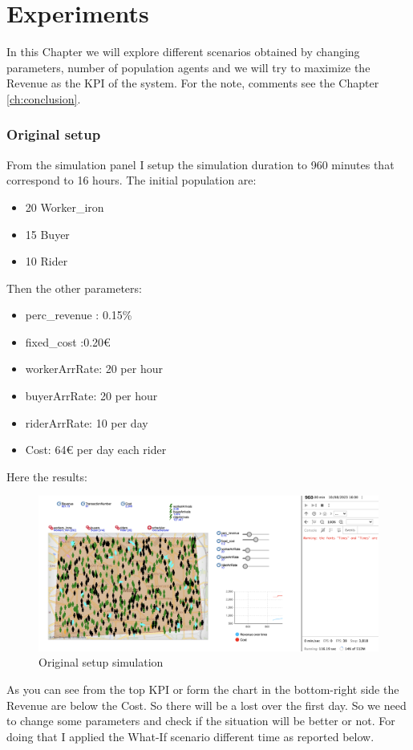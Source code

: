\chapter{Experiments} \label{ch:experiments}
In this Chapter we will explore different scenarios obtained by changing parameters, number of population agents and we will try to maximize the Revenue as the KPI of the system. For the note, comments see the Chapter \ref{ch:conclusion}.
\subsection{Original setup}
From the simulation panel I setup the simulation duration to 960 minutes that correspond to 16 hours. The initial population are:
\begin{itemize}
\item 20 Worker\_iron
\item 15 Buyer
\item 10 Rider
\end{itemize}
Then the other parameters:
\begin{itemize}
\item perc\_revenue : 0.15\%
\item fixed\_cost :0.20€
\item workerArrRate: 20 per hour
\item buyerArrRate: 20 per hour
\item riderArrRate: 10 per day
\item Cost: 64€ per day each rider
\end{itemize}
Here the results:
\begin{figure}[hbtp]
\caption{Original setup simulation}
\centering
\includegraphics[scale=0.3]{../Images/sim01.png}
\end{figure}
As you can see from the top KPI or form the chart in the bottom-right side the Revenue are below the Cost. So there will be a lost over the first day. So we need to change some parameters and check if the situation will be better or not. For doing that I applied the What-If scenario different time as reported below.
